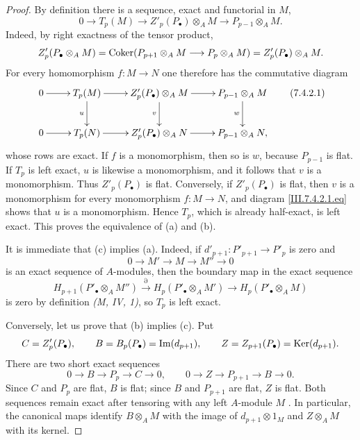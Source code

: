\begin{proof}
By definition there is a sequence, exact and functorial in
$M$,
\[
  0
  \longrightarrow
  T_p(M)
  \longrightarrow
  Z'_p(P_\bullet)\otimes_A M
  \longrightarrow
  P_{p-1}\otimes_A M.
\]
Indeed, by right exactness of the tensor product,
\[
  Z'_p(P_\bullet\otimes_A M)
  =
  \operatorname{Coker}(P_{p+1}\otimes_A M\longrightarrow
         P_p\otimes_A M)
  =
  Z'_p(P_\bullet)\otimes_A M.
\]
For every homomorphism $f:M\to N$ one therefore has the
commutative diagram
\[
\xymatrix{
  0 \ar[r]
    & T_p(M) \ar[r] \ar[d]_{u}
    & Z'_p(P_\bullet)\otimes_A M \ar[r] \ar[d]_{v}
    & P_{p-1}\otimes_A M \ar[d]_{w} \\
  0 \ar[r]
    & T_p(N) \ar[r]
    & Z'_p(P_\bullet)\otimes_A N \ar[r]
    & P_{p-1}\otimes_A N,
}
\tag{7.4.2.1}\label{III.7.4.2.1.eq}
\]
whose rows are exact.  If $f$ is a monomorphism, then so is
$w$, because $P_{p-1}$ is flat.  If $T_p$ is left exact,
$u$ is likewise a monomorphism, and it follows that $v$ is a
monomorphism.  Thus $Z'_p(P_\bullet)$ is flat.  Conversely, if
$Z'_p(P_\bullet)$ is flat, then $v$ is a monomorphism for every
monomorphism $f:M\to N$, and diagram
\eqref{III.7.4.2.1.eq} shows that $u$ is a monomorphism.
Hence $T_p$, which is already half-exact, is left exact.  This
proves the equivalence of (a) and (b).

It is immediate that (c) implies (a).  Indeed, if
$d'_{p+1}:P'_{p+1}\to P'_p$ is zero and
\[
  0\longrightarrow M'\longrightarrow M\longrightarrow M''
  \longrightarrow 0
\]
is an exact sequence of $A$-modules, then the boundary map in
the exact sequence
\[
  H_{p+1}(P'_\bullet\otimes_A M'')
  \xrightarrow{\partial}
  H_p(P'_\bullet\otimes_A M')
  \longrightarrow
  H_p(P'_\bullet\otimes_A M)
\]
is zero by definition \emph{(M, IV, 1)}, so $T_p$ is left
exact.

Conversely, let us prove that (b) implies (c). Put
\[
 C=Z'_p(P_\bullet),\qquad
 B=B_p(P_\bullet)=\operatorname{Im}(d_{p+1}),\qquad
 Z=Z_{p+1}(P_\bullet)=\operatorname{Ker}(d_{p+1}).
\]
There are two short exact sequences
\[
 0\longrightarrow B\longrightarrow P_p\longrightarrow C\longrightarrow0,
 \qquad
 0\longrightarrow Z\longrightarrow P_{p+1}\longrightarrow B\longrightarrow0.
\]
Since $C$ and $P_p$ are flat, $B$ is flat; since $B$ and $P_{p+1}$
are flat, $Z$ is flat. Both sequences remain exact after tensoring with
any left $A$-module $M$ . In particular, the canonical
maps identify $B\otimes_A M$ with the image of $d_{p+1}\otimes1_M$
and $Z\otimes_A M$ with its kernel.


\end{proof}
